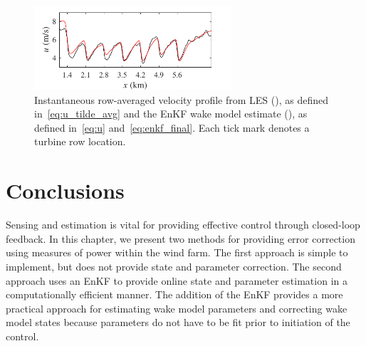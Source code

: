\begin{figure}[t!]
\centering
\includegraphics[width=0.65\textwidth]{./fig/u.pdf}
\caption{Instantaneous row-averaged velocity profile from LES (\full), as defined in~\eqref{eq:u_tilde_avg} and the EnKF wake model estimate ({\color{red}\full}), as defined in~\eqref{eq:u} and~\eqref{eq:enkf_final}. Each tick mark denotes a turbine row location.}
\label{fig:u}
\end{figure}

\section{Conclusions}
\label{sec:estimation-conclusons}
Sensing and estimation is vital for providing effective control through closed-loop feedback. In this chapter, we present two methods for providing error correction using measures of power within the wind farm. The first approach is simple to implement, but does not provide state and parameter correction. The second approach uses an EnKF to provide online state and parameter estimation in a computationally efficient manner. The addition of the EnKF provides a more practical approach for estimating wake model parameters and correcting wake model states because parameters do not have to be fit prior to initiation of the control.





